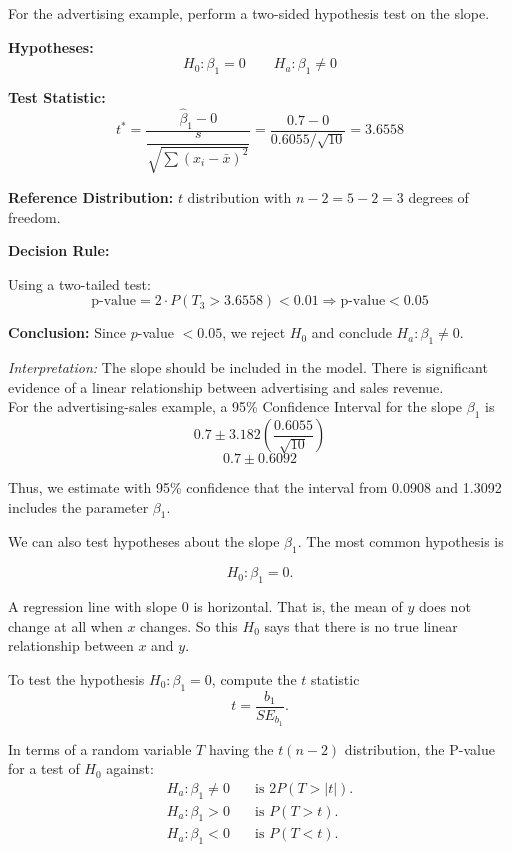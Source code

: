 \begin{example}[continued]
For the advertising example, perform a two-sided hypothesis test on the slope.

\textbf{Hypotheses:}
\[
H_0\!: \beta_1 = 0 
\qquad 
H_a\!: \beta_1 \neq 0
\]

\vspace{0.5em}
\textbf{Test Statistic:}
\[
t^* = \frac{\hat{\beta}_1 - 0}{\dfrac{s}{\sqrt{\sum (x_i - \bar{x})^2}}}
= \frac{0.7 - 0}{0.6055 / \sqrt{10}} = 3.6558
\]

\vspace{0.5em}
\textbf{Reference Distribution:} 
$t$ distribution with $n - 2 = 5 - 2 = 3$ degrees of freedom.

\vspace{0.5em}
\textbf{Decision Rule:} 

Using a two-tailed test:
\[
\text{p-value} = 2 \cdot P(T_3 > 3.6558) < 0.01 \Rightarrow \text{p-value} < 0.05
\]

\textbf{Conclusion:}  
Since $p$-value $< 0.05$, we reject $H_0$ and conclude $H_a\!: \beta_1 \neq 0$.

\textit{Interpretation:}  
The slope should be included in the model. There is significant evidence of a linear relationship between advertising and sales revenue.\\

For the advertising-sales example, a 95\% Confidence Interval for the slope $\beta_1$ is
\[
0.7 \pm 3.182 \left( \frac{0.6055}{\sqrt{10}} \right)
\]
\[
0.7 \pm 0.6092
\]

Thus, we estimate with 95\% confidence that the interval from 0.0908 and 1.3092 includes the parameter $\beta_1$.
\end{example}
We can also test hypotheses about the slope $\beta_1$. The most common hypothesis is

\[
H_0 : \beta_1 = 0.
\]

A regression line with slope 0 is horizontal. That is, the mean of $y$ does not change at all when $x$ changes. So this $H_0$ says that there is no true linear relationship between $x$ and $y$.
\begin{tcolorbox}[title=\textbf{Testing the Hypothesis for \boldmath$\beta_1$},
colback=yellow!10,
colframe=black!45,
coltitle=black,
fonttitle=\bfseries,
breakable]

To test the hypothesis $H_0 : \beta_1 = 0$, compute the $t$ statistic
\[
t = \frac{b_1}{SE_{b_1}}.
\]

In terms of a random variable $T$ having the $t(n - 2)$ distribution, the P-value for a test of $H_0$ against:
\begin{align*}
H_a : \beta_1 \ne 0 & \quad \text{is } 2P(T > |t|). \\
H_a : \beta_1 > 0 & \quad \text{is } P(T > t). \\
H_a : \beta_1 < 0 & \quad \text{is } P(T < t).
\end{align*}

\end{tcolorbox}

